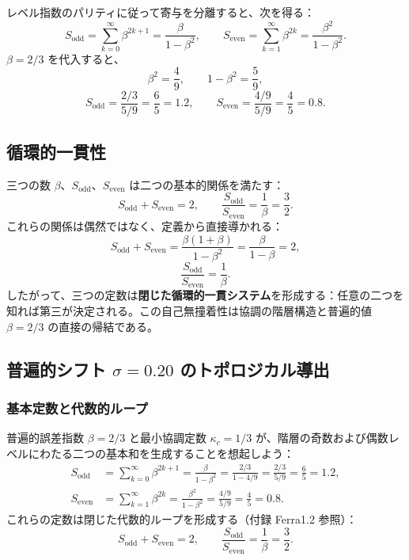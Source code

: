 \documentclass[11pt,a4paper]{article}
\begin{document}
	レベル指数のパリティに従って寄与を分離すると、次を得る：
	\[
	S_{\text{odd}} = \sum_{k=0}^{\infty} \beta^{2k+1} = \frac{\beta}{1-\beta^2},
	\qquad
	S_{\text{even}} = \sum_{k=1}^{\infty} \beta^{2k} = \frac{\beta^2}{1-\beta^2}.
	\]
	\(\beta = 2/3\) を代入すると、
	\[
	\beta^2 = \frac{4}{9},\qquad 1-\beta^2 = \frac{5}{9},
	\]
	\[
	S_{\text{odd}} = \frac{2/3}{5/9} = \frac{6}{5}=1.2,\qquad
	S_{\text{even}} = \frac{4/9}{5/9} = \frac{4}{5}=0.8.
	\]
	
	\subsection{循環的一貫性}
	三つの数 \(\beta\)、\(S_{\text{odd}}\)、\(S_{\text{even}}\) は二つの基本的関係を満たす：
	\[
	S_{\text{odd}} + S_{\text{even}} = 2,\qquad
	\frac{S_{\text{odd}}}{S_{\text{even}}} = \frac{1}{\beta} = \frac{3}{2}.
	\]
	これらの関係は偶然ではなく、定義から直接導かれる：
	\[
	S_{\text{odd}} + S_{\text{even}} = \frac{\beta(1+\beta)}{1-\beta^2} = \frac{\beta}{1-\beta}=2,
	\]
	\[
	\frac{S_{\text{odd}}}{S_{\text{even}}} = \frac{1}{\beta}.
	\]
	したがって、三つの定数は\textbf{閉じた循環的一貫システム}を形成する：任意の二つを知れば第三が決定される。この自己無撞着性は協調の階層構造と普遍的値 \(\beta=2/3\) の直接の帰結である。
	
	\subsection{普遍的シフト \(\sigma = 0.20\) のトポロジカル導出}
	\label{sec:sigma_topology}
	
	\subsubsection{基本定数と代数的ループ}
	
	普遍的誤差指数 \(\beta = 2/3\) と最小協調定数 \(\kappa_c = 1/3\) が、階層の奇数および偶数レベルにわたる二つの基本和を生成することを想起しよう：
	\begin{align}
		S_{\mathrm{odd}} &= \sum_{k=0}^{\infty} \beta^{2k+1} = \frac{\beta}{1-\beta^2} = \frac{2/3}{1-4/9} = \frac{2/3}{5/9} = \frac{6}{5} = 1.2, \label{eq:Sodd_again}\\
		S_{\mathrm{even}} &= \sum_{k=1}^{\infty} \beta^{2k} = \frac{\beta^2}{1-\beta^2} = \frac{4/9}{5/9} = \frac{4}{5} = 0.8. \label{eq:Seven_again}
	\end{align}
	これらの定数は閉じた代数的ループを形成する（付録 Ferra1.2 参照）：
	\[
	S_{\mathrm{odd}} + S_{\mathrm{even}} = 2, \qquad \frac{S_{\mathrm{odd}}}{S_{\mathrm{even}}} = \frac{1}{\beta} = \frac{3}{2}.
	\]
	
\end{document}
